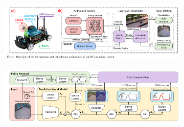 \begin{figure}[!ht]
    \centering
    \begin{subfigure}{0.4\textwidth}
        \includegraphics[width=\textwidth]{img/21}\label{fig:21}
    \end{subfigure}
    \begin{subfigure}{0.4\textwidth}
        \includegraphics[width=\textwidth]{img/22}\label{fig:22}
    \end{subfigure}
\end{figure}

\clearpage

